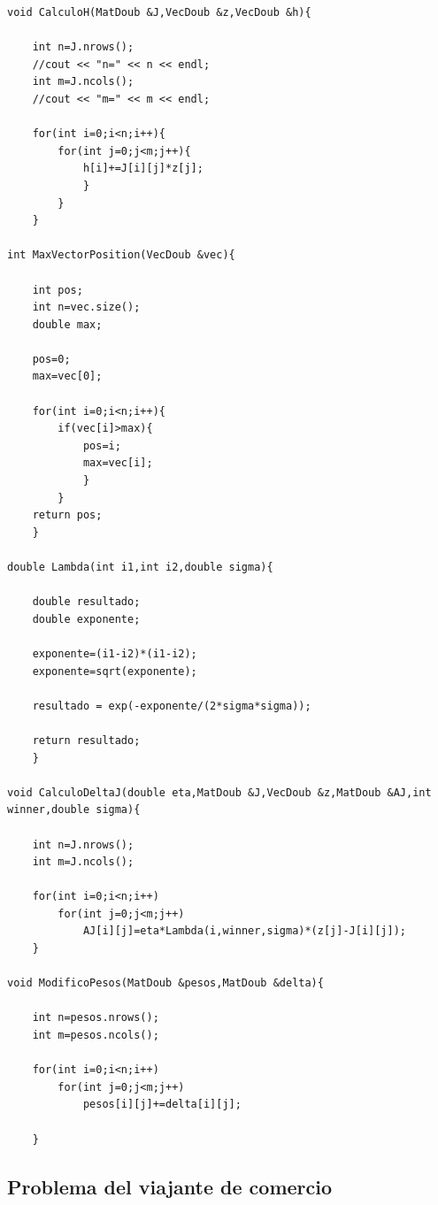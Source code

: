 \documentclass[aps,prb,onecolumn,10pt,floatfix,superscriptaddress]{article} %
\begin{document}
\begin{lstlisting}[frame=single,breaklines=true]
void CalculoH(MatDoub &J,VecDoub &z,VecDoub &h){
	
	int n=J.nrows();
	//cout << "n=" << n << endl;
	int m=J.ncols();
	//cout << "m=" << m << endl;
	
	for(int i=0;i<n;i++){
		for(int j=0;j<m;j++){
			h[i]+=J[i][j]*z[j];
			}
		}
	}
	
int MaxVectorPosition(VecDoub &vec){
	
	int pos;
	int n=vec.size();
	double max;
	
	pos=0;
	max=vec[0];
	
	for(int i=0;i<n;i++){
		if(vec[i]>max){
			pos=i;
			max=vec[i];
			}
		}
	return pos;
	}

double Lambda(int i1,int i2,double sigma){
	
	double resultado;
	double exponente;
	
	exponente=(i1-i2)*(i1-i2);
	exponente=sqrt(exponente);
	
	resultado = exp(-exponente/(2*sigma*sigma));
	
	return resultado;
	}
	
void CalculoDeltaJ(double eta,MatDoub &J,VecDoub &z,MatDoub &AJ,int winner,double sigma){
	
	int n=J.nrows();
	int m=J.ncols();
	
	for(int i=0;i<n;i++)
		for(int j=0;j<m;j++)
			AJ[i][j]=eta*Lambda(i,winner,sigma)*(z[j]-J[i][j]);
	}
	
void ModificoPesos(MatDoub &pesos,MatDoub &delta){
	
	int n=pesos.nrows();
	int m=pesos.ncols();
	
	for(int i=0;i<n;i++)
		for(int j=0;j<m;j++)
			pesos[i][j]+=delta[i][j];

	}

\end{lstlisting}

\subsection{Problema del viajante de comercio}
\end{document}

